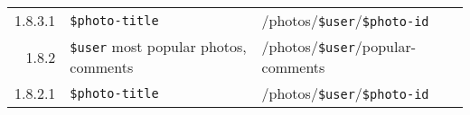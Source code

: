 \documentclass[12pt,a4paper]{article}
\newcommand{\var}[1]{\texttt{\${#1}}}
\begin{document}
\begin{table}[h!b!p!]
\begin{adjustwidth}{-6em}{-6em}
\begin{center}
\begin{small}
\begin{tabular}{|r|l|l|}
                    1.8.3.1 &
                    \var{photo-title} &
                    /photos/\var{user}/\var{photo-id} \\

                  1.8.2 &
                  \var{user} most popular photos, comments &
                  /photos/\var{user}/popular-comments \\

                    1.8.2.1 &
                    \var{photo-title} &
                    /photos/\var{user}/\var{photo-id} \\

          \hline

        \end{tabular}
      \end{small}
    \end{center}
  \end{adjustwidth}
\end{table}
\end{document}
